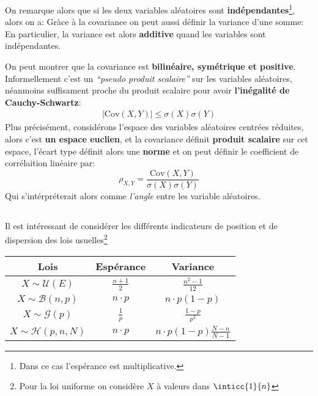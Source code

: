 On remarque alors que si les deux variables aléatoires sont \textbf{indépendantes}\footnote[2]{Dans ce cas l'espérance est multiplicative.}, alors on a:
Gràce à la covariance on peut aussi définir la variance d'une somme:
En particulier, la variance est alors \textbf{additive} quand les variables sont indépendantes.\<

On peut montrer que la covariance est \textbf{bilinéaire, symétrique et positive}. Informellement c'est un \textit{``pseudo produit scalaire''} sur les variables aléatoires, néanmoins suffisament proche du produit scalaire pour avoir \textbf{l'inégalité de Cauchy-Schwartz}:
\begin{align*}
   |\text{Cov}(X, Y)| \leq \sigma(X)\sigma(Y)
\end{align*}
Plus précisément, considérons l'espace des variables aléatoires centrées réduites, alors c'est \textbf{un espace euclien}, et la covariance définit \textbf{produit scalaire} sur cet espace, l'écart type définit alors une \textbf{norme} et on peut définir le coefficient de corrélaition linéaire par:
\[
   \rho_{X, Y} = \frac{\text{Cov}(X, Y)}{\sigma(X)\sigma(Y)}
\]
Qui s'intérpréterait alors comme \textit{l'angle} entre les variable aléatoires.
\pagebreak

\subsection*{}
Il est intéressant de considérer les différents indicateurs de position et de dispersion des lois usuelles\footnote[1]{Pour la loi uniforme on considère \(X\) à valeurs dans \(\inticc{1}{n}\)}

\begin{center}
   \renewcommand{\arraystretch}{2}
   \setlength{\tabcolsep}{18pt}
   
   \begin{tabular}{|c||c|c|}
      \hline
      Lois & \cellcolor{BrightBlue1!40} Espérance & \cellcolor{BrightBlue1!40} Variance \\ 
      \hline
      \cellcolor{BrightBlue1!40} \(X \sim \mathcal{U}(E)\) & \(\frac{n+1}{2}\) & \(\frac{n^2 - 1}{12}\) \\ 
      \hline
      \cellcolor{BrightBlue1!40} \(X \sim \mathcal{B}(n, p)\) & \(n\cdot p\) &  \(n\cdot p(1-p)\) \\ 
      \hline
      \cellcolor{BrightBlue1!40} \(X \sim \mathcal{G}(p)\) & \(\frac{1}{p}\) & \(\frac{1-p}{p^2}\) \\ 
      \hline
      \cellcolor{BrightBlue1!40} \(X \sim \mathcal{H}(p, n, N)\) & \(n\cdot p\) & \(n\cdot p(1-p)\frac{N - n}{N - 1}\) \\ 
      \hline
   \end{tabular}
\end{center}

